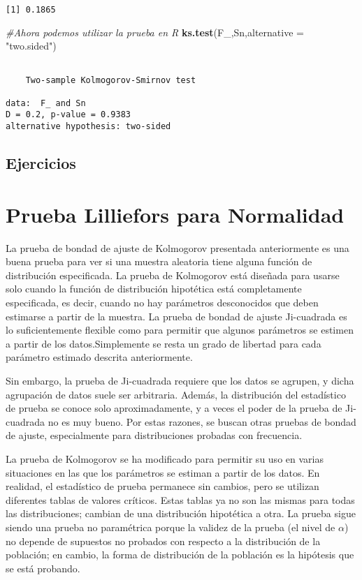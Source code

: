 \documentclass[a4paper,oneside,openany]{book}
\newenvironment{Shaded}{\begin{snugshade}}{\end{snugshade}}
\newcommand{\KeywordTok}[1]{\textcolor[rgb]{0.13,0.29,0.53}{\textbf{#1}}}
\newcommand{\DataTypeTok}[1]{\textcolor[rgb]{0.13,0.29,0.53}{#1}}
\newcommand{\StringTok}[1]{\textcolor[rgb]{0.31,0.60,0.02}{#1}}
\newcommand{\CommentTok}[1]{\textcolor[rgb]{0.56,0.35,0.01}{\textit{#1}}}
\newcommand{\NormalTok}[1]{#1}
\begin{document}
\begin{verbatim}
[1] 0.1865
\end{verbatim}

\begin{Shaded}
\begin{Highlighting}[]
\CommentTok{#Ahora podemos utilizar la prueba en R}
\KeywordTok{ks.test}\NormalTok{(F_,Sn,}\DataTypeTok{alternative =} \StringTok{"two.sided"}\NormalTok{)}
\end{Highlighting}
\end{Shaded}

\begin{verbatim}

    Two-sample Kolmogorov-Smirnov test

data:  F_ and Sn
D = 0.2, p-value = 0.9383
alternative hypothesis: two-sided
\end{verbatim}

\section{Ejercicios}\label{ejercicios-15}

\chapter{Prueba Lilliefors para
Normalidad}\label{prueba-lilliefors-para-normalidad}

La prueba de bondad de ajuste de Kolmogorov presentada anteriormente es
una buena prueba para ver si una muestra aleatoria tiene alguna función
de distribución especificada. La prueba de Kolmogorov está diseñada para
usarse solo cuando la función de distribución hipotética está
completamente especificada, es decir, cuando no hay parámetros
desconocidos que deben estimarse a partir de la muestra. La prueba de
bondad de ajuste Ji-cuadrada es lo suficientemente flexible como para
permitir que algunos parámetros se estimen a partir de los
datos.Simplemente se resta un grado de libertad para cada parámetro
estimado descrita anteriormente.

Sin embargo, la prueba de Ji-cuadrada requiere que los datos se agrupen,
y dicha agrupación de datos suele ser arbitraria. Además, la
distribución del estadístico de prueba se conoce solo aproximadamente, y
a veces el poder de la prueba de Ji-cuadrada no es muy bueno. Por estas
razones, se buscan otras pruebas de bondad de ajuste, especialmente para
distribuciones probadas con frecuencia.

La prueba de Kolmogorov se ha modificado para permitir su uso en varias
situaciones en las que los parámetros se estiman a partir de los datos.
En realidad, el estadístico de prueba permanece sin cambios, pero se
utilizan diferentes tablas de valores críticos. Estas tablas ya no son
las mismas para todas las distribuciones; cambian de una distribución
hipotética a otra. La prueba sigue siendo una prueba no paramétrica
porque la validez de la prueba (el nivel de \(\alpha\)) no depende de
supuestos no probados con respecto a la distribución de la población; en
cambio, la forma de distribución de la población es la hipótesis que se
está probando.
\end{document}
